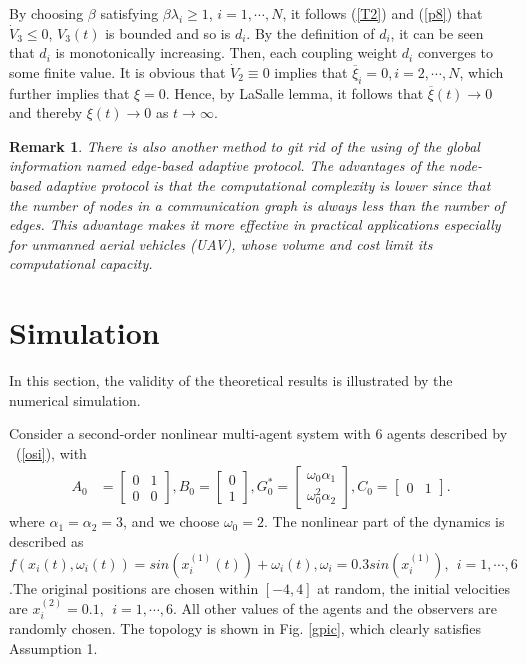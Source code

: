 \documentclass[english]{cccconf}
\newtheorem{remark}{Remark}
\begin{document}
By choosing $\beta$ satisfying $\beta \lambda_i \geq 1$, $i=1,\cdots, N$, it follows (\ref{T2}) and (\ref{p8}) that $\dot V_3 \leq 0$, $V_3(t)$ is bounded and so is $d_i$. By the definition of $d_i$, it can be seen that $d_i$ is monotonically increasing. Then, each coupling weight $d_i$ converges to some finite value. It is obvious that $\dot V_2 \equiv 0$ implies that $\overline \xi_i = 0, i = 2,\cdots, N$, which further implies that $\xi = 0$. Hence, by LaSalle lemma, it follows that $\overline \xi(t) \to 0 $ and thereby $\xi(t) \to 0$ as $t \to \infty$.
 
\begin{remark}
There is also another method to git rid of the using of the global information named edge-based adaptive protocol. The advantages of the node-based adaptive protocol is that the computational complexity is lower since that the number of nodes in a communication graph is always less than the number of edges. This advantage makes it more effective in practical applications especially for unmanned aerial vehicles (UAV), whose volume and cost limit its computational capacity. 
\end{remark}










\section{Simulation}

In this section, the validity of the theoretical results is illustrated by the numerical simulation.

Consider a second-order nonlinear multi-agent system with 6 agents described by ~(\ref{osi}), with
$$\begin{aligned}
A_{0}&=\begin{bmatrix} 0 & 1\\ 0 & 0\end{bmatrix},B_{0}=\begin{bmatrix} 0 \\ 1\end{bmatrix},
G^*_0=\begin{bmatrix} \omega_0 \alpha_1 \\ \omega^2_0 \alpha_2\end{bmatrix},C_0=\begin{bmatrix} 0 &1\end{bmatrix}.
\end{aligned}$$ where $\alpha_1 = \alpha_2 = 3$, and we choose $\omega_0=2$. The nonlinear part of the dynamics is described as $f(x_i(t),\omega_i(t))=sin(x^{(1)}_i(t))+\omega_i(t), \omega_i=0.3sin(x^{(1)}_i),~~i=1,\cdots, 6$.The original positions are chosen within $[-4,4]$ at random, the initial velocities are $x^{(2)}_i=0.1,~~i=1,\cdots, 6$. All other values of the agents and the observers are randomly chosen. The topology is shown in Fig. \ref{gpic}, which clearly satisfies Assumption 1.
\end{document}
